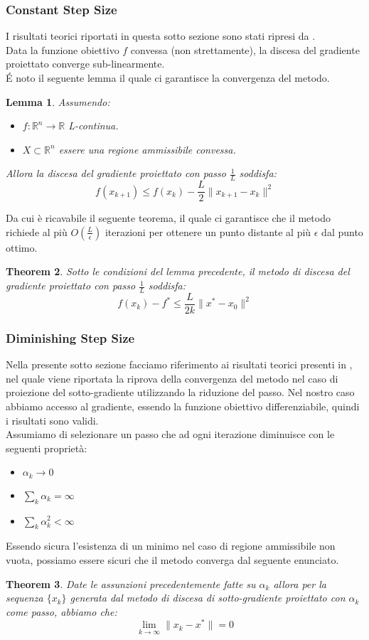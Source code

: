 \documentclass{article}
\newtheorem{theorem}{Theorem}[section]
\newtheorem{lemma}[theorem]{Lemma}
\begin{document}
\subsubsection{Constant Step Size}
I risultati teorici riportati in questa sotto sezione sono stati ripresi da \cite{notesfirstom}.\\
Data la funzione obiettivo $f$ convessa (non strettamente), la discesa del gradiente proiettato converge sub-linearmente.\\
\'E noto il seguente lemma il quale ci garantisce la convergenza del metodo. 
\begin{lemma}
Assumendo:
\begin{itemize}
    \item $f : \mathbb{R}^n \to \mathbb{R}$ L-continua.
    \item $X \subset \mathbb{R}^n$ essere una regione ammissibile convessa.
\end{itemize}
Allora la discesa del gradiente proiettato con passo $\frac{1}{L}$ soddisfa:
\[f(x_{k+1}) \leq f(x_k) - \frac{L}{2}\|x_{k+1} - x_k\|^2 \]
\end{lemma}
Da cui è ricavabile il seguente teorema, il quale ci garantisce che il metodo richiede al più $O(\frac{L}{\epsilon})$ iterazioni per ottenere un punto distante al più $\epsilon$ dal punto ottimo.
\begin{theorem}
Sotto le condizioni del lemma precedente, il metodo di discesa del gradiente proiettato con passo $\frac{1}{L}$ soddisfa:
\[f(x_k) - f^* \leq \frac{L}{2k}\| x^* - x_0 \|^2\]
\end{theorem}
\subsubsection{Diminishing Step Size}
Nella presente sotto sezione facciamo riferimento ai risultati teorici presenti in \cite{sgd_notes}, nel quale viene riportata la riprova della convergenza del metodo nel caso di proiezione del sotto-gradiente utilizzando la riduzione del passo. Nel nostro caso abbiamo accesso al gradiente, essendo la funzione obiettivo differenziabile, quindi i risultati sono validi.\\
Assumiamo di selezionare un passo che ad ogni iterazione diminuisce con le seguenti proprietà:
\begin{itemize}
    \item $\alpha_k \to 0$
    \item $\sum_k \alpha_k = \infty$
    \item $\sum_k \alpha_k^2 < \infty$
\end{itemize}
Essendo sicura l'esistenza di un minimo nel caso di regione ammissibile non vuota, possiamo essere sicuri che il metodo converga dal seguente enunciato.
\begin{theorem}
Date le assunzioni precedentemente fatte su $\alpha_k$ allora per la sequenza $\{x_k\}$ generata dal metodo di discesa di sotto-gradiente proiettato con $\alpha_k$ come passo, abbiamo che:
\[\lim_{k \to \infty} \| x_k - x^*\| = 0\]
\end{theorem}
\end{document}
